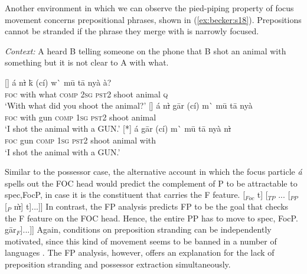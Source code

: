 \documentclass[output=paper,
modfonts
]{langscibook}
\begin{document}
Another environment in which we can observe the pied-piping property of focus movement concerns prepositional phrases, shown in (\ref{ex:becker:s18}). Prepositions cannot be stranded if the phrase they merge with is narrowly focused.
\begin{exe}
\ex \textit{Context:} A heard B telling someone on the phone that B shot an animal with something but it is not clear to A with what.\label{ex:becker:s18}
\begin{xlist}
[]{
\gll \'a n\sout{\`i} k\=\textepsilon{} (c\'i) w\`\textepsilon{} m\=u t\=a ny\`a \`a? \\  
   \textsc{foc} with what \textsc{comp} \textsc{2sg} \textsc{pst2} shoot animal \textsc{q}    \\ 
\glt `With what did you shoot the animal?'}
[]{
\gll \'a n\sout{\`i} g\=ar (c\'i) m\`\textepsilon{} m\=u t\=a ny\`a \\  
     \textsc{foc} with gun \textsc{comp} \textsc{1sg} \textsc{pst2} shoot animal  \\ 
\glt `I shot the animal with a GUN.'}
[*]{
\gll \'a g\=ar (c\'i) m\`\textepsilon{} m\=u t\=a ny\`a n\sout{\`i} \\  
     \textsc{foc} gun \textsc{comp} \textsc{1sg} \textsc{pst2} shoot animal with \\ 
\glt `I shot the animal with a GUN.'}
\end{xlist}
\end{exe}
Similar to the possessor case, the alternative account in which the focus particle {\em \'a} spells out the FOC head would predict the complement of P to be attractable to spec,FocP, in case it is the constituent that carries the F feature.
\ea *[... \'a\sub{1} [$_{FocP}$ [$_{DP}$ \textipa{N}g\tikzmark{f}\=ar$_F$] [$_{Foc}$ t] [$_{TP}$ ... [$_{PP}$ [$_{P}$ n\sout{\`{\i}}] t]...]]
	 \label{ex:becker:s19}
\z
\vspace{3mm}
In contrast, the FP analysis predicts FP to be the goal that checks the F feature on the FOC head. Hence, the entire PP has to move to spec, FocP.
\ea \relax[$_{FocP}$ \tikzmark{f2}\hspace{2mm}\tikzmark{f} [$_{Foc}$ c\'i] [$_{TP}$ ... [$_{F\tikzmark{t}P}$ \'a [$_{PP}$ [$_P$ n\sout{\`{\i}}] g\=ar$_F$]...]]
     \label{ex:becker:s20}
\z
\vspace{6mm}
Again, conditions on preposition stranding can be independently motivated, since this kind of movement seems to be banned in a number of languages \citep{Abels2003,Heck2008}. The FP analysis, however, offers an explanation for the lack of preposition stranding and possessor extraction simultaneously.
\end{document}

